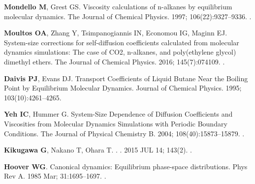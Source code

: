 \documentclass[9pt,bestpractices]{livecoms}
\begin{document}
\begin{thebibliography}{59}
\textbf{\color{LiveCoMSMediumGrey} Mondello M}, Grest GS.
\newblock Viscosity calculations of n-alkanes by equilibrium molecular
  dynamics.
\newblock The Journal of Chemical Physics.  1997; 106(22):9327--9336.
\newblock \href{https://dx.doi.org/10.1063/1.474002}{\doiprefix
  }.

\textbf{\color{LiveCoMSMediumGrey} Moultos OA}, Zhang Y, Tsimpanogiannis IN,
  Economou IG, Maginn EJ.
\newblock System-size corrections for self-diffusion coefficients calculated
  from molecular dynamics simulations: The case of CO2, n-alkanes, and
  poly(ethylene glycol) dimethyl ethers.
\newblock The Journal of Chemical Physics.  2016; 145(7):074109.
\newblock \href{https://dx.doi.org/10.1063/1.4960776}{\doiprefix
  }.

\textbf{\color{LiveCoMSMediumGrey} Daivis PJ}, Evans DJ.
\newblock Transport Coefficients of Liquid Butane Near the Boiling Point by
  Equilibrium Molecular Dynamics.
\newblock Journal of Chemical Physics.  1995; 103(10):4261--4265.

\textbf{\color{LiveCoMSMediumGrey} Yeh IC}, Hummer G.
\newblock System-Size Dependence of Diffusion Coefficients and Viscosities from
  Molecular Dynamics Simulations with Periodic Boundary Conditions.
\newblock The Journal of Physical Chemistry B.  2004; 108(40):15873--15879.
\newblock \href{https://dx.doi.org/10.1021/jp0477147}{\doiprefix
  }.

\textbf{\color{LiveCoMSMediumGrey} Kikugawa G}, Nakano T, Ohara T.
.
.  {2015} {JUL 14}; {143}({2}).
\newblock \href{https://dx.doi.org/{10.1063/1.4926841}}{\doiprefix
  }.

\textbf{\color{LiveCoMSMediumGrey} Hoover WG}.
\newblock Canonical dynamics: Equilibrium phase-space distributions.
\newblock Phys Rev A.  1985 Mar; 31:1695--1697.
\newblock \href{https://dx.doi.org/10.1103/PhysRevA.31.1695}{\doiprefix
  }.


\end{thebibliography}
\end{document}

